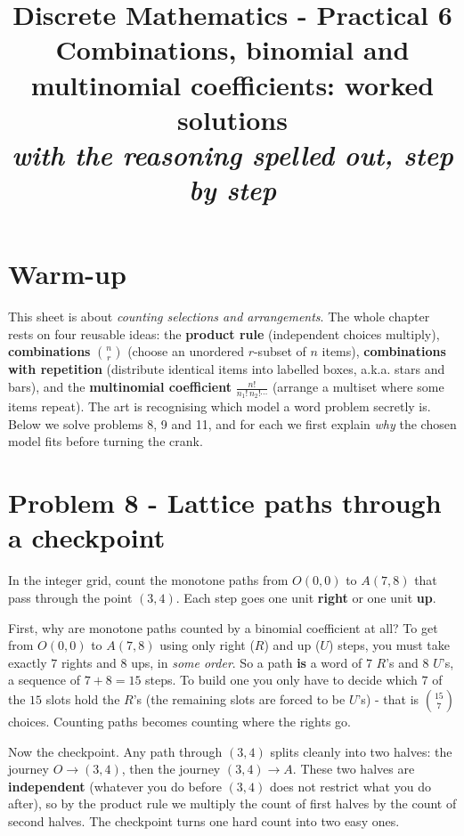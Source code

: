 \documentclass[11pt,a4paper]{article}
\title{\vspace{-1.2cm}\textbf{Discrete Mathematics - Practical 6}\\[2pt]
\large Combinations, binomial and multinomial coefficients: worked solutions\\[2pt]
\normalsize\itshape with the reasoning spelled out, step by step}
\author{}
\date{}
\begin{document}
\maketitle
\vspace{-1.0cm}

\section*{Warm-up}
This sheet is about \emph{counting selections and arrangements}. The whole chapter rests on
four reusable ideas: the \textbf{product rule} (independent choices multiply), \textbf{combinations}
$\binom{n}{r}$ (choose an unordered $r$-subset of $n$ items), \textbf{combinations with repetition}
(distribute identical items into labelled boxes, a.k.a. stars and bars), and the
\textbf{multinomial coefficient} $\frac{n!}{n_1!\,n_2!\cdots}$ (arrange a multiset where some items
repeat). The art is recognising which model a word problem secretly is. Below we solve problems 8,
9 and 11, and for each we first explain \emph{why} the chosen model fits before turning the crank.

\section*{Problem 8 - Lattice paths through a checkpoint}

\begin{problembox}[8]
In the integer grid, count the monotone paths from $O(0,0)$ to $A(7,8)$ that pass through the
point $(3,4)$. Each step goes one unit \textbf{right} or one unit \textbf{up}.
\end{problembox}

\begin{ideabox}
First, why are monotone paths counted by a binomial coefficient at all? To get from $O(0,0)$ to
$A(7,8)$ using only right ($R$) and up ($U$) steps, you must take exactly $7$ rights and $8$ ups,
in \emph{some order}. So a path \textbf{is} a word of $7$ $R$'s and $8$ $U$'s, a sequence of
$7+8=15$ steps. To build one you only have to decide which $7$ of the $15$ slots hold the $R$'s (the
remaining slots are forced to be $U$'s) - that is $\binom{15}{7}$ choices. Counting paths becomes
counting where the rights go.

Now the checkpoint. Any path through $(3,4)$ splits cleanly into two halves: the journey
$O\to(3,4)$, then the journey $(3,4)\to A$. These two halves are \textbf{independent} (whatever you
do before $(3,4)$ does not restrict what you do after), so by the product rule we multiply the count
of first halves by the count of second halves. The checkpoint turns one hard count into two easy
ones.
\end{ideabox}
\end{document}
